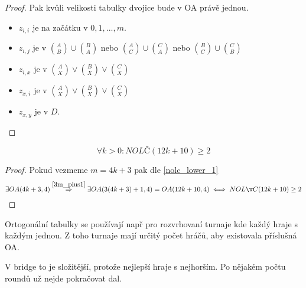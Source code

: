 \begin{proof}
	Pak kvůli velikosti tabulky dvojice bude v OA právě jednou.

	\begin{itemize}
		\item $z_{i, i}$ je na začátku v $0, 1, ..., m$.
		\item $z_{i, j}$ je  v $\binom{A}{B} \cup \binom{B}{A}$ nebo $\binom{A}{C} \cup \binom{C}{A}$ nebo $\binom{B}{C} \cup \binom{C}{B}$
		\item $z_{i, x}$ je v $\binom{A}{X} \lor \binom{B}{X} \lor \binom{C}{X}$
		\item $z_{x, i}$ je v $\binom{A}{X} \lor \binom{B}{X} \lor \binom{C}{X}$
		\item $z_{x, y}$ je v $D$.
	\end{itemize}

\end{proof}


\begin{theorem}
	\[ \forall k > 0: NOLČ(12 k + 10) \geq 2 \]
\end{theorem}
\begin{proof}
	Pokud vezmeme $m = 4k + 3$ pak dle \cref{nolc_lower_1}
	\[ \exists OA(4k + 3, 4) \stackrel{\cref{3m_plus1}}{\Rightarrow} \exists OA(3(4k + 3) + 1, 4) = OA(12k + 10, 4) \iff NOLČ(12k + 10) \geq 2 \]
\end{proof}

\begin{note}
	Ortogonální tabulky se používají např pro rozvrhovaní turnaje kde každý hraje s každým jednou.
	Z toho turnaje mají určitý počet hráčů, aby existovala příslušná OA.

	V bridge to je složitější, protože nejlepší hraje s nejhorším.
	Po nějakém počtu roundů už nejde pokračovat dal.
\end{note}
